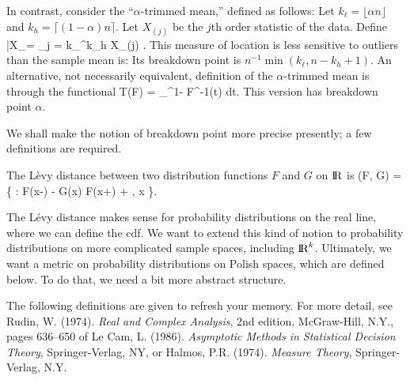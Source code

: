In contrast, consider the ``$\alpha$-trimmed mean,'' defined as follows:
Let $k_\ell = \lfloor \alpha n \rfloor$ and $ k_h = \lceil (1-\alpha) n \rceil$.
Let $X_{(j)}$ be the $j$th order statistic of the data.
Define
\beq
    \bar{X}_\alpha =  \sum_{j = k_\ell}^{k_h} X_{(j)} .
\eeq
This measure of location is less sensitive to outliers than the sample mean is:
Its breakdown point is $n^{-1} \min(k_\ell, n-k_h + 1)$.
An alternative, not necessarily equivalent, definition of the $\alpha$-trimmed
mean is through the functional
\beq
    T(F) = \int_\alpha^{1-\alpha} F^{-1}(t) dt.
\eeq
This version has breakdown point  $\alpha$.

We shall make the notion of breakdown point more precise presently; a few definitions
are required.

\begin{Definition}
        The L\`{e}vy distance between two distribution functions $F$ and $G$
        on $\hbox{I\kern-.17em\hbox{R}}$ is
        \beq
            \lambda(F, G) = \inf\{ \epsilon : F(x-\epsilon) - \epsilon \le G(x) \le F(x+\epsilon) +
            \epsilon, \;\;\forall x \in \bfR \}.
        \eeq
\end{Definition}

The L\'{e}vy distance makes sense for probability distributions on the real line, where
we can define the cdf.
We want to extend this kind of notion to probability distributions on more complicated
sample spaces, including $\hbox{I\kern-.17em\hbox{R}}^k$.
Ultimately, we want a metric on probability distributions on Polish spaces,
which are defined below.
To do that, we need a bit more abstract structure.

The following definitions are given to refresh your memory.
For more detail, see Rudin, W. (1974). {\em Real and Complex Analysis\/},
2nd edition, McGraw-Hill, N.Y., pages 636--650 of Le Cam, L. (1986). {\em Asymptotic Methods in
Statistical Decision Theory\/}, Springer-Verlag, NY, or Halmos, P.R. (1974). {\em Measure Theory\/},
Springer-Verlag, N.Y.

